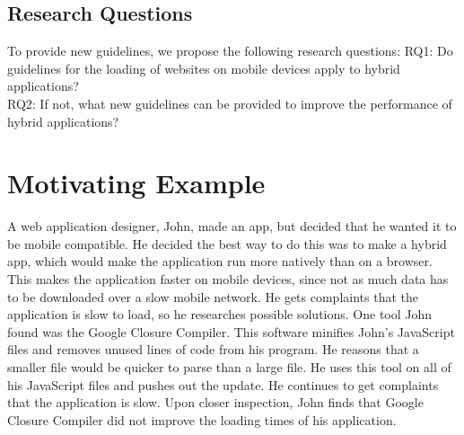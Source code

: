 \documentclass{acm_proc_article-sp}
\begin{document}
\subsection{Research Questions}
To provide new guidelines, we propose the following research questions:
RQ1: Do guidelines for the loading of websites on mobile devices apply to hybrid applications?\\
RQ2: If not, what new guidelines can be provided to improve the performance of hybrid applications?

\section{Motivating Example} 
A web application designer, John, made an app, but decided that he wanted it to be mobile compatible.
He decided the best way to do this was to make a hybrid app, which would make the application run more natively than on a browser.
This makes the application faster on mobile devices, since not as much data has to be downloaded over a slow mobile network.
He gets complaints that the application is slow to load, so he researches possible solutions.
One tool John found was the Google Closure Compiler.
This software minifies John's JavaScript files and removes unused lines of code from his program.
He reasons that a smaller file would be quicker to parse than a large file.
He uses this tool on all of his JavaScript files and pushes out the update.
He continues to get complaints that the application is slow.
Upon closer inspection, John finds that Google Closure Compiler did not improve the loading times of his application.
\end{document}
